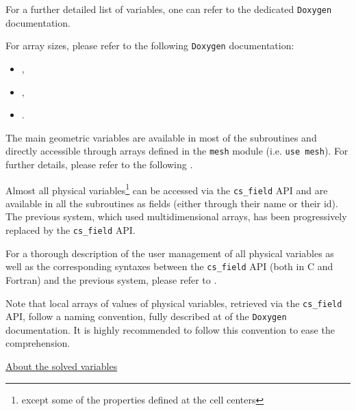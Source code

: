 {{{{For a further detailed list of variables, one can refer to the dedicated
\texttt{Doxygen} documentation.

\label{sec:prg_dimensions}

For array sizes, please refer to the following \texttt{Doxygen} documentation:
\begin{itemize}
\item {},
\item {},
\item {}.
\end{itemize}


The main geometric variables are available in most of the
subroutines and directly accessible through arrays defined
in the \texttt{mesh} module (i.e. \texttt{use mesh}). For
further details, please refer to the following
.


Almost all physical variables\footnote{except some of the properties defined at
the cell centers} can be accessed via the \texttt{cs\_field} API and are
available in all the subroutines as fields (either through their name or their
id). The previous system, which used multidimensional arrays, has been
progressively replaced by the \texttt{cs\_field} API.

For a thorough description of the user management of all physical
variables as well as the corresponding syntaxes between the \texttt{cs\_field}
API (both in C and Fortran) and the previous system, please refer to
.

Note that local arrays of values of physical variables, retrieved via the
\texttt{cs\_field} API, follow a naming convention, fully described at
 of the \texttt{Doxygen} documentation. It
is highly recommended to follow this convention to ease the comprehension.

\underline{About the solved variables}

}}}}
